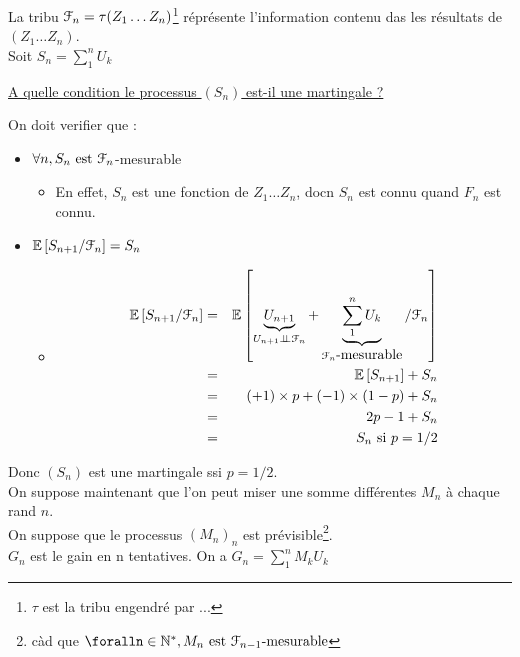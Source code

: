 \documentclass{report}
\newcommand{\indep}{\perp \!\!\! \perp}
\begin{document}
La tribu $\EuScript{F}_n = \tau(Z_1\dots Z_n)$\footnote{$\tau$ est la tribu engendré par ...} réprésente l'information contenu das les résultats de $(Z_1\dots Z_n)$.
\\ Soit $S_n = \displaystyle\sum_1^nU_k$

\vspace{1cm}
\underline{A quelle condition le processus $(S_n)$ est-il une martingale ?}

\vspace{0.5cm}
On doit verifier que : 
\begin{itemize}
    \item $\forall n, S_n \mbox{ est }\EuScript{F}_n$-mesurable
    \begin{itemize}$\hookrightarrow$
        \item En effet, $S_n$ est une fonction de $Z_1\dots Z_n$, docn $S_n$ est connu quand $F_n$ est connu.
    \end{itemize}
    \item $\mathbb{E}\left[S_{n+1}/\EuScript{F}_n\right] = S_n$
    \begin{itemize}$\hookrightarrow$
        \item \begin{eqnarray}
        \mathbb{E}\left[S_{n+1}/\EuScript{F}_n\right] & = & \mathbb{E}\left[\underbrace{U_{n+1}}_{U_{n+1}\indep\EuScript{F}_n} + \underbrace{\displaystyle\sum_1^nU_k}_{\EuScript{F}_n\mbox{-mesurable}}/\EuScript{F}_n\right]\nonumber\\
        & = & \mathbb{E}\left[S_{n+1}\right] + S_n\nonumber\\
        & = & (+1)\times p + (-1)\times (1-p) +S_n \nonumber \\
        & = & 2p-1+S_n\nonumber \\
        & = & S_n \mbox{ si }p=1/2\nonumber
        \end{eqnarray}
    \end{itemize}
\end{itemize}

Donc $(S_n)$ est une martingale ssi $p=1/2$.\\


\vspace{0.5cm}
On suppose maintenant que l'on peut miser une somme différentes $M_n$ à chaque rand $n$.\\
On suppose que le processus $(M_n)_n$ est prévisible\footnote{càd que $\foralln\in \mathbb{N}^*, M_n\mbox{ est }\EuScript{F}_{n-1}\mbox{-mesurable}$}.\\
$G_n$ est le gain en n tentatives. On a $G_n = \displaystyle\sum_1^nM_kU_k$
\end{document}

